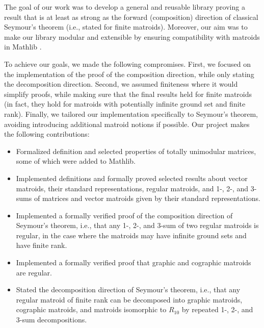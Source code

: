 The goal of our work was to develop a general and reusable library proving a result that is at least as strong as the forward (composition) direction of classical Seymour's theorem (i.e., stated for finite matroids). Moreover, our aim was to make our library modular and extensible by ensuring compatibility with matroids in Mathlib \cite{Mathlib}.
\pagebreak[4] %

To achieve our goals, we made the following compromises. First, we focused on the implementation of the proof of the composition direction, while only stating the decomposition direction. Second, we assumed finiteness where it would simplify proofs, while making sure that the final results held for finite matroids (in fact, they hold for matroids with potentially infinite ground set and finite rank). Finally, we tailored our implementation specifically to Seymour's theorem, avoiding introducing additional matroid notions if possible.
Our project makes the following contributions:
\begin{itemize}
    \item Formalized definition and selected properties of totally unimodular matrices, some of which were added to Mathlib.
    \item Implemented definitions and formally proved selected results about vector matroids, their standard representations, regular matroids, and 1-, 2-, and 3-sums of matrices and vector matroids given by their standard representations.
    \item Implemented a formally verified proof of the composition direction of Seymour's theorem, i.e., that any \hbox{1-,} 2-, and 3-sum of two regular matroids is regular, in the case where the matroids may have infinite ground sets and have finite rank.
    \item Implemented a formally verified proof that graphic and cographic matroids are regular.
    \item Stated the decomposition direction of Seymour's theorem, i.e., that any regular matroid of finite rank can be decomposed into graphic matroids, cographic matroids, and matroids isomorphic to $R_{10}$ by repeated 1-, 2-, and 3-sum decompositions. %
\end{itemize}

